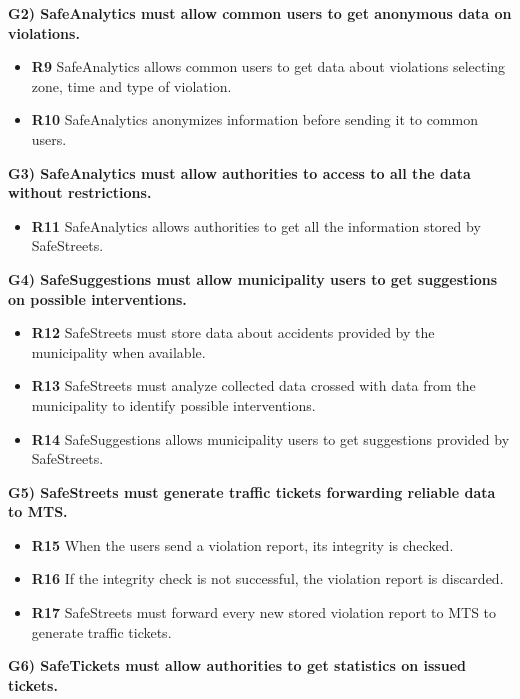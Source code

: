 \documentclass[a4paper]{article}
\begin{document}
\textbf{G2) SafeAnalytics must allow common users to get anonymous data
on violations.}

\begin{itemize}
\item
  \textbf{R9} SafeAnalytics allows common users to get data about
  violations selecting zone, time and type of violation.
\item
  \textbf{R10} SafeAnalytics anonymizes information before sending it to
  common users.
\end{itemize}

\textbf{G3) SafeAnalytics must allow authorities to access to all the
data without restrictions.}

\begin{itemize}
\item
  \textbf{R11} SafeAnalytics allows authorities to get all the information
  stored by SafeStreets.
\end{itemize}

\textbf{G4) SafeSuggestions must allow municipality users to get
suggestions on possible interventions.}

\begin{itemize}
\item
  \textbf{R12} SafeStreets must store data about accidents provided by
  the municipality when available.
\item
  \textbf{R13} SafeStreets must analyze collected data crossed with data
  from the municipality to identify possible interventions.
\item
  \textbf{R14} SafeSuggestions allows municipality users to get
  suggestions provided by SafeStreets.
\end{itemize}

\textbf{G5) SafeStreets must generate traffic tickets forwarding
reliable data to MTS.}

\begin{itemize}
\item
  \textbf{R15} When the users send a violation report, its integrity is
  checked.
\item
  \textbf{R16} If the integrity check is not successful, the violation
  report is discarded.
\item
  \textbf{R17} SafeStreets must forward every new stored violation
  report to MTS to generate traffic tickets.
\end{itemize}

\textbf{G6) SafeTickets must allow authorities to get statistics on
issued tickets.}
\end{document}

